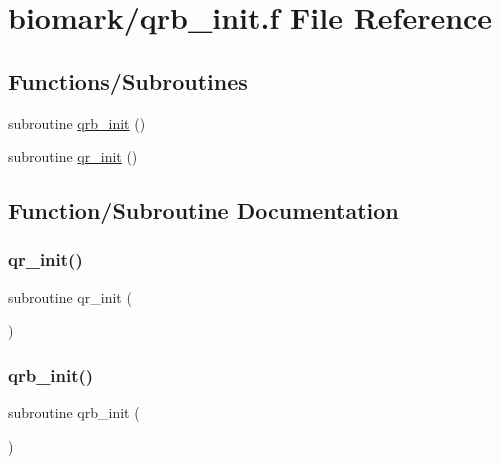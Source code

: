 \hypertarget{qrb__init_8f}{}\section{biomark/qrb\+\_\+init.f File Reference}
\label{qrb__init_8f}
\subsection*{Functions/\+Subroutines}
\begin{DoxyCompactItemize}
\item 
subroutine \hyperlink{qrb__init_8f_a3536f0d5da9ba4faec42b9f292ff368b}{qrb\+\_\+init} ()
\item 
subroutine \hyperlink{qrb__init_8f_af7240c14716ac7a794546a49beaf0d88}{qr\+\_\+init} ()
\end{DoxyCompactItemize}


\subsection{Function/\+Subroutine Documentation}
\mbox{\label{qrb__init_8f_af7240c14716ac7a794546a49beaf0d88}} 
\subsubsection{\texorpdfstring{qr\+\_\+init()}{qr\_init()}}
{\footnotesize\ttfamily subroutine qr\+\_\+init (\begin{DoxyParamCaption}{ }\end{DoxyParamCaption})}

\mbox{\label{qrb__init_8f_a3536f0d5da9ba4faec42b9f292ff368b}} 
\subsubsection{\texorpdfstring{qrb\+\_\+init()}{qrb\_init()}}
{\footnotesize\ttfamily subroutine qrb\+\_\+init (\begin{DoxyParamCaption}{ }\end{DoxyParamCaption})}

